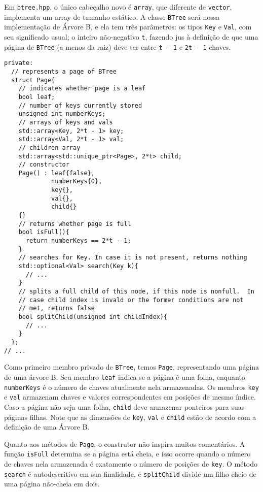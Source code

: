 \documentclass[11pt]{article}
\begin{document}
Em \texttt{btree.hpp}, o único cabeçalho novo é \texttt{array}, que diferente de
\texttt{vector}, implementa um array de tamanho estático.  A classe
\texttt{BTree} será nossa implementação de Árvore B, e ela tem três
parâmetros: os tipos \texttt{Key} e \texttt{Val}, com seu significado usual; o
inteiro não-negativo \texttt{t}, fazendo jus à definição de que uma
página de \texttt{BTree} (a menos da raiz) deve ter entre \texttt{t - 1} e \texttt{2t -
    1} chaves.

\begin{verbatim}
private:
  // represents a page of BTree
  struct Page{
    // indicates whether page is a leaf
    bool leaf;
    // number of keys currently stored
    unsigned int numberKeys;
    // arrays of keys and vals
    std::array<Key, 2*t - 1> key;
    std::array<Val, 2*t - 1> val;
    // children array
    std::array<std::unique_ptr<Page>, 2*t> child;
    // constructor
    Page() : leaf{false},
             numberKeys{0},
             key{},
             val{},
             child{}
    {}
    // returns whether page is full
    bool isFull(){
      return numberKeys == 2*t - 1;
    }
    // searches for Key. In case it is not present, returns nothing
    std::optional<Val> search(Key k){
      // ...
    }
    // splits a full child of this node, if this node is nonfull.  In
    // case child index is invald or the former conditions are not
    // met, returns false
    bool splitChild(unsigned int childIndex){
      // ...
    }
  };
// ...
\end{verbatim}

Como primeiro membro privado de \texttt{BTree}, temos \texttt{Page},
representando uma página de uma árvore B.  Seu membro \texttt{leaf}
indica se a página é uma folha, enquanto \texttt{numberKeys} é o número
de chaves atualmente nela armazenadas.  Os membros \texttt{key} e \texttt{val}
armazenam chaves e valores correspondentes em posições de mesmo
índice.  Caso a página não seja uma folha, \texttt{child} deve armazenar
ponteiros para suas páginas filhas.  Note que as dimensões de
\texttt{key}, \texttt{val} e \texttt{child} estão de acordo com a definição de uma
Árvore B.

Quanto aos métodos de \texttt{Page}, o construtor não inspira muitos
comentários.  A função \texttt{isFull} determina se a página está cheia,
e isso ocorre quando o número de chaves nela armazenada é
exatamente o número de posições de \texttt{key}.  O método \texttt{search} é
autodescritivo em sua finalidade, e \texttt{splitChild} divide um filho
cheio de uma página não-cheia em dois.
\end{document}
